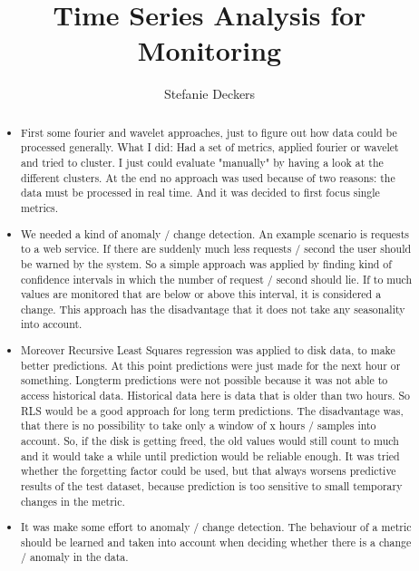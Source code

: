\documentclass[]{article}
\title{Time Series Analysis for Monitoring}
\author{Stefanie Deckers}
\begin{document}
\maketitle

\begin{abstract}

\begin{itemize}
	
	\item First some fourier and wavelet approaches, just to figure out how data could be processed generally. What I did: Had a set of metrics, applied fourier or wavelet and tried to cluster. I just could evaluate "manually" by having a look at the different clusters. At the end no approach was used because of two reasons: the data must be processed in real time. And it was decided to first focus single metrics. 
	
	\item We needed a kind of anomaly / change detection. An example scenario is requests to a web service. If there are suddenly much less requests / second the user should be warned by the system. So a simple approach was applied by finding kind of confidence intervals in which the number of request / second should lie. If to much values are monitored that are below or above this interval, it is considered a change. This approach has the disadvantage that it does not take any seasonality into account.
	
	\item Moreover Recursive Least Squares regression was applied to disk data, to make better predictions. At this point predictions were just made for the next hour or something. Longterm predictions were not possible because it was not able to access historical data. Historical data here is data that is older than two hours. So RLS would be a good approach for long term predictions. The disadvantage was, that there is no possibility to take only a window of x hours / samples into account. So, if the disk is getting freed, the old values would still count to much and it would take a while until prediction would be reliable enough. It was tried whether the forgetting factor could be used, but that always worsens predictive results of the test dataset, because prediction is too sensitive to small temporary changes in the metric.
	
	\item It was make some effort to anomaly / change detection. The behaviour of a metric should be learned and taken into account when deciding whether there is a change / anomaly in the data. 
	

\end{itemize}
\end{abstract}
\end{document}
